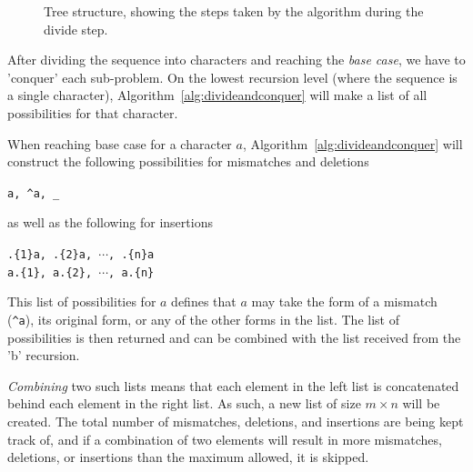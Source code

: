 \documentclass[12pt]{article}
\theoremstyle{definition}
\begin{document}
\begin{figure}[H]
	\centering
	\caption{Tree structure, showing the steps taken by the algorithm during the divide step.}
	\label{fig:tree_example}
\end{figure}

After dividing the sequence into characters and reaching the \emph{base case}, we have to 'conquer' each sub-problem. On the lowest recursion level (where the sequence is a single character), Algorithm~\ref{alg:divideandconquer} will make a list of all possibilities for that character.

\begin{definition}[label=definition:possibilities]
When reaching base case for a character $a$, Algorithm~\ref{alg:divideandconquer} will construct the following possibilities for mismatches and deletions

\begin{center}
	\texttt{a, \^{}a, \_}
\end{center}

\noindent as well as the following for insertions

\begin{center}
	\texttt{.\{1\}a, .\{2\}a, $\cdots$, .\{n\}a} \\
	\texttt{a.\{1\}, a.\{2\}, $\cdots$, a.\{n\}}
\end{center}

\noindent This list of possibilities for $a$ defines that $a$ may take the form of a mismatch (\texttt{\^{}a}), its original form, or any of the other forms in the list. The list of possibilities is then returned and can be combined with the list received from the 'b' recursion.
\end{definition}

\emph{Combining} two such lists means that each element in the left list is concatenated behind each element in the right list. As such, a new list of size $m \times n$ will be created. The total number of mismatches, deletions, and insertions are being kept track of, and if a combination of two elements will result in more mismatches, deletions, or insertions than the maximum allowed, it is skipped.
\end{document}
